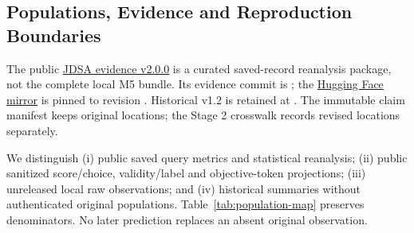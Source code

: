 \subsection{Populations, Evidence and Reproduction Boundaries}
\label{app:reproduction}
The public \href{https://github.com/SoroushVahidi/combinatorial-opt-agent/releases/tag/jdsa-evidence-v2.0.0}{JDSA evidence v2.0.0} is a curated saved-record reanalysis package, not the complete local M5 bundle. Its evidence commit is ; the \href{https://huggingface.co/datasets/SoroushVahidi/nl-optimization-instantiation-metrics/tree/f94012872211ab6a828147bb138fbe8ab695b982/releases/jdsa-evidence-v2.0.0}{Hugging Face mirror} is pinned to revision . Historical v1.2 is retained at . The immutable claim manifest keeps original locations; the Stage 2 crosswalk records revised locations separately.

We distinguish (i) public saved query metrics and statistical reanalysis; (ii) public sanitized score/choice, validity/label and objective-token projections; (iii) unreleased local raw observations; and (iv) historical summaries without authenticated original populations. Table~\ref{tab:population-map} preserves denominators. No later prediction replaces an absent original observation.

